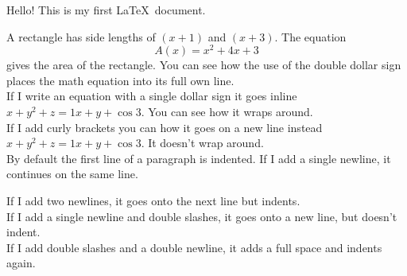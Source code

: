 \documentclass[11pt]{article}
\begin{document}
Hello! This is my first \LaTeX\ document.

A rectangle has side lengths of $(x+1)$ and $(x+3)$.
The equation $${A(x)=x^2+4x+3}$$ gives the area of the rectangle. You can see how the use of the double dollar sign places the math equation into its full own line.\\

If I write an equation with a single dollar sign it goes inline $x+y^2+z=1x+y+\cos 3$. You can see how it wraps around.\\

If I add curly brackets you can how it goes on a new line instead ${x+y^2+z=1x+y+\cos 3}$. It doesn't wrap around.\\

By default the first line of a paragraph is indented.
If I add a single newline, it continues on the same line.

If I add two newlines, it goes onto the next line but indents.\\
If I add a single newline and double slashes, it goes onto a new line, but doesn't indent.\\

If I add double slashes and a double newline, it adds a full space and indents again.
\end{document}
